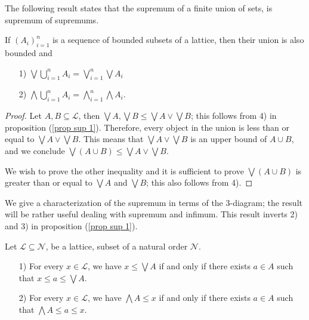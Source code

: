 \documentclass [12pt]{book}
\begin{document}
The following result states that the supremum of a finite union of sets, is supremum of supremums.

\begin{proposition}If $(A_i)_{i=1}^n$ is a sequence of bounded subsets of a lattice, then their union is also bounded and \begin{itemize}\item[1)]$\bigvee\bigcup\limits_{i=1}^n A_i=\bigvee\limits_{i=1}^n\bigvee A_i$\item[2)]$\bigwedge\bigcup\limits_{i=1}^n A_i=\bigwedge\limits_{i=1}^n\bigwedge A_i$.\end{itemize}\end{proposition}

\begin{proof}Let $A,B\subseteq\mathcal L$, then $\bigvee A,\bigvee B\leq \bigvee A\vee\bigvee B$; this follows from 4) in proposition (\ref{prop sup 1}). Therefore, every object in the union is less than or equal to $\bigvee A\vee\bigvee B$. This means that $\bigvee A\vee\bigvee B$ is an upper bound of $A\cup B$, and we conclude $\bigvee(A\cup B)\leq\bigvee A\vee\bigvee B$. 

We wish to prove the other inequality and it is sufficient to prove $\bigvee(A\cup B)$ is greater than or equal to $\bigvee A$ and $\bigvee B$; this also follows from 4).\end{proof}

We give a characterization of the supremum in terms of the 3-diagram; the result will be rather useful dealing with supremum and infimum. This result inverts 2) and 3) in proposition (\ref{prop sup 1}).

\begin{proposition}Let $\mathcal L\subseteq\mathcal N$, be a lattice, subset of a natural order $\mathcal N$.

\begin{itemize}

	\item[1)]For every $x\in\mathcal L$, we have $x\leq\bigvee A$ if and only if there exists $a\in A$ such that $x\leq a\leq\bigvee A$.

	\item[2)]For every $x\in\mathcal L$, we have $\bigwedge A\leq x$ if and only if there exists $a\in A$ such that $\bigwedge A\leq a\leq x$.

\end{itemize}

 \end{proposition}
\end{document}
